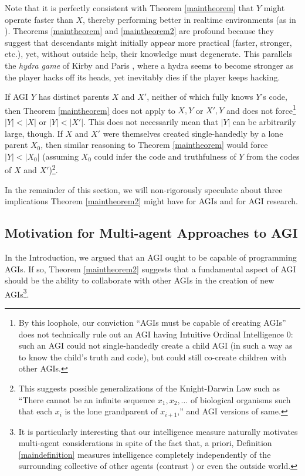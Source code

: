 \documentclass[runningheads]{llncs}
\begin{document}
Note that it is perfectly consistent with
Theorem \ref{maintheorem} that $Y$ might operate faster
than $X$, thereby performing better in realtime environments (as in \cite{gavane}).
Theorems \ref{maintheorem} and \ref{maintheorem2} are profound because
they suggest that descendants might initially appear more practical
(faster, stronger, etc.),
yet, without outside help, their knowledge must degenerate.
This parallels the \emph{hydra game} of
Kirby and Paris \cite{kirby1982accessible}, where a hydra
seems to become stronger as the player hacks off its heads, yet
inevitably dies if the player keeps hacking.

If AGI $Y$ has distinct parents $X$ and $X'$, neither of which fully knows
$Y$'s code, then Theorem \ref{maintheorem} does not apply to $X,Y$ or $X',Y$ and
does not force\footnote{By this loophole, our conviction ``AGIs must be capable of creating
AGIs'' does not technically rule out an AGI having Intuitive Ordinal Intelligence $0$:
such an AGI could not single-handedly create a child AGI (in such a way as
to know the child's truth and code), but could still
co-create children with other AGIs.}
$|Y|<|X|$ or $|Y|<|X'|$. This does not necessarily mean that
$|Y|$ can be arbitrarily large, though. If $X$ and $X'$ were themselves
created single-handedly by a lone parent $X_0$, then similar
reasoning to Theorem \ref{maintheorem} would force $|Y|<|X_0|$ (assuming $X_0$
could infer the code and truthfulness of $Y$ from the codes of $X$ and $X'$)\footnote{This
suggests possible generalizations of the Knight-Darwin Law such as ``There cannot be
an infinite sequence $x_1,x_2,\ldots$ of biological organisms such that each $x_i$
is the lone grandparent of $x_{i+1}$,'' and AGI versions of same.}.

In the remainder of this section, we will non-rigorously speculate about three implications
Theorem \ref{maintheorem2} might have for AGIs and for AGI research.


\subsection{Motivation for Multi-agent Approaches to AGI}

In the Introduction, we argued that an AGI ought to be
capable of programming AGIs. If so, Theorem \ref{maintheorem2} suggests
that a fundamental aspect of AGI should be the ability to collaborate with other
AGIs in the creation of new AGIs\footnote{It is particularly interesting that our
intelligence measure naturally motivates multi-agent considerations in spite of
the fact that, a priori, Definition \ref{maindefinition} measures intelligence
completely independently of the surrounding collective of other agents
(contrast \cite{hernandez2011more}) or even the outside world.}.
\end{document}
